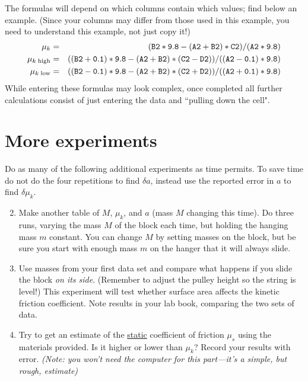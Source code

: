 The formulas will depend on which columns contain which values; find below
an example.  (Since your columns may differ from those used in this example,
you need to understand this example, not just copy it!)
\begin{eqnarray}
\mu_k &= & {\tt (B2*9.8-(A2+B2)*C2)/(A2*9.8)}\\
\mu_{k\; \rm high}&=& {\tt ((B2+0.1)*9.8-(A2+B2)*(C2-D2))/((A2-0.1)*9.8)}\\
\mu_{k\; \rm low}&=& {\tt ((B2-0.1)*9.8-(A2+B2)*(C2+D2))/((A2+0.1)*9.8)}
\end{eqnarray}
While entering these formulas may look complex, once completed all further calculations
consist of just entering the data and ``pulling down the cell".

\section*{More experiments}

Do as many of the following additional experiments as time permits.  To save
time do not do the four repetitions to find $\delta a$, instead 
use the \WAPP reported error in $a$ to find $\delta \mu_{k}$.
\begin{enumerate}
\setcounter{enumi}{1}
\item Make another table of $M$, $\mu_{k}$, and $a$ (mass $M$ changing this time).
Do three runs, varying the mass $M$ of
the block each time, but holding the hanging mass $m$ constant.
You can change $M$ by setting masses on the block, but be sure you
start with enough mass $m$ on the hanger that it will always slide.
%
\item  Use masses from your first data set and compare what happens
if you slide the block {\em on its side}.  (Remember to adjust the
pulley height so the string is level!) This experiment will test
whether surface area affects
the kinetic friction coefficient.  Note results in your lab book, comparing the two sets
of data.
%
\item Try to get an estimate of the \underline{static} coefficient of friction
$\mu_{s}$ using the materials provided.
Is it higher or lower than $\mu_{k}$?  Record your results with error.
{\em (Note: you won't need the computer for this part---it's a
simple, but rough, estimate)}
%
\end{enumerate}

